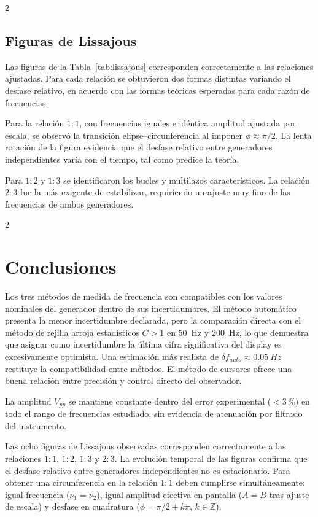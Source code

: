 \documentclass[12pt,a4paper]{article}
\begin{document}
\begin{multicols}{2}
\subsection{Figuras de Lissajous}

Las figuras de la Tabla~\ref{tab:lissajous} corresponden correctamente a las relaciones ajustadas. Para cada relación se obtuvieron dos formas distintas variando el desfase relativo, en acuerdo con las formas teóricas esperadas para cada razón de frecuencias.

Para la relación $1{:}1$, con frecuencias iguales e idéntica amplitud ajustada por escala, se observó la transición elipse--circunferencia al imponer $\phi \approx \pi/2$. La lenta rotación de la figura evidencia que el desfase relativo entre generadores independientes varía con el tiempo, tal como predice la teoría.

Para $1{:}2$ y $1{:}3$ se identificaron los bucles y multilazos característicos. La relación $2{:}3$ fue la más exigente de estabilizar, requiriendo un ajuste muy fino de las frecuencias de ambos generadores.

\end{multicols}

\begin{multicols}{2}

\section{Conclusiones}

Los tres métodos de medida de frecuencia son compatibles con los valores nominales del generador dentro de sus incertidumbres. El método automático presenta la menor incertidumbre declarada, pero la comparación directa con el método de rejilla arroja estadísticos $C > 1$ en \SI{50}{Hz} y \SI{200}{Hz}, lo que demuestra que asignar como incertidumbre la última cifra significativa del display es excesivamente optimista. Una estimación más realista de $\delta f_{auto} \approx \SI{0,05}{Hz}$ restituye la compatibilidad entre métodos. El método de cursores ofrece una buena relación entre precisión y control directo del observador.

La amplitud $V_{pp}$ se mantiene constante dentro del error experimental ($< 3\,$\%) en todo el rango de frecuencias estudiado, sin evidencia de atenuación por filtrado del instrumento.

Las ocho figuras de Lissajous observadas corresponden correctamente a las relaciones $1{:}1$, $1{:}2$, $1{:}3$ y $2{:}3$. La evolución temporal de las figuras confirma que el desfase relativo entre generadores independientes no es estacionario. Para obtener una circunferencia en la relación $1{:}1$ deben cumplirse simultáneamente: igual frecuencia ($\nu_1 = \nu_2$), igual amplitud efectiva en pantalla ($A = B$ tras ajuste de escala) y desfase en cuadratura ($\phi = \pi/2 + k\pi$, $k \in \mathbb{Z}$).

\end{multicols}
\end{document}
